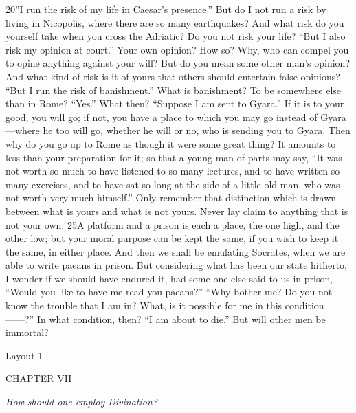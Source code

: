 20''I run the risk of my life in Caesar's presence.'' But do I not run a risk by living in Nicopolis, where there are so many earthquakes? And what risk do you yourself take when you cross the Adriatic? Do you not risk your life? ``But I also risk my opinion at court.'' Your own opinion? How so? Why, who can compel you to opine anything against your will? But do you mean some other man's opinion? And what kind of risk is it of yours that others should entertain false opinions? ``But I run the risk of banishment.'' What is banishment? To be somewhere else than in Rome? ``Yes.'' What then? ``Suppose I am sent to Gyara.'' If it is to your good, you will go; if not, you have a place to which you may go instead of Gyara—where he too will go, whether he will or no, who is sending you to Gyara. Then why do you go up to Rome as though it were some great thing? It amounts to less than your preparation for it; so that a young man of parts may say, ``It was not worth so much to have listened to so many lectures, and to have written so many exercises, and to have sat so long at the side of a little old man, who was not worth very much himself.'' Only remember that distinction which is drawn between what is yours and what is not yours. Never lay claim to anything that is not your own. 25A platform and a prison is each a place, the one high, and the other low; but your moral purpose can be kept the same, if you wish to keep it the same, in either place. And then we shall be emulating Socrates, when we are able to write paeans in prison. But considering what has been our state hitherto, I wonder if we should have endured it, had some one else said to us in prison, ``Would you like to have me read you paeans?'' ``Why bother me? Do you not know the trouble that I am in? What, is it possible for me in this condition ——?'' In what condition, then? ``I am about to die.'' But will other men be immortal?



Layout 1

CHAPTER VII

\emph{How should one employ Divination?}

